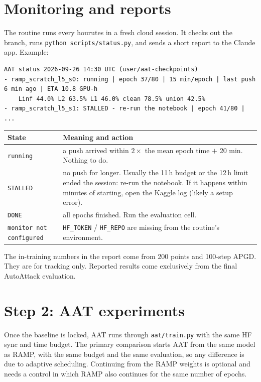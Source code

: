 \documentclass[11pt,a4paper]{article}
\newcommand{\code}[1]{\texttt{\small #1}}
\begin{document}
\section{Monitoring and reports}

The routine runs every hourutes in a fresh cloud session. It checks out the branch, runs
\code{python scripts/status.py}, and sends a short report to the Claude app. Example:
\begin{lstlisting}
AAT status 2026-09-26 14:30 UTC (user/aat-checkpoints)
- ramp_scratch_l5_s0: running | epoch 37/80 | 15 min/epoch | last push 6 min ago | ETA 10.8 GPU-h
    Linf 44.0% L2 63.5% L1 46.0% clean 78.5% union 42.5%
- ramp_scratch_l5_s1: STALLED - re-run the notebook | epoch 41/80 | ...
\end{lstlisting}

\begin{table}[h]
\centering\small
\begin{tabularx}{\linewidth}{@{}lX@{}}
\toprule
State & Meaning and action \\
\midrule
\code{running} & a push arrived within $2\times$ the mean epoch time $+$ 20 min. Nothing to do. \\
\code{STALLED} & no push for longer. Usually the 11\,h budget or the 12\,h limit ended the session: re-run the notebook. If it happens within minutes of starting, open the Kaggle log (likely a setup error). \\
\code{DONE} & all epochs finished. Run the evaluation cell. \\
\code{monitor not configured} & \code{HF\_TOKEN} / \code{HF\_REPO} are missing from the routine's environment. \\
\bottomrule
\end{tabularx}
\end{table}
The in-training numbers in the report come from 200 points and 100-step APGD. They are for tracking
only. Reported results come exclusively from the final AutoAttack evaluation.

\section{Step 2: AAT experiments}

Once the baseline is locked, AAT runs through \code{aat/train.py} with the same HF sync and time
budget. The primary comparison starts AAT from the same model as RAMP, with the same budget and the
same evaluation, so any difference is due to adaptive scheduling. Continuing from the RAMP weights is
optional and needs a control in which RAMP also continues for the same number of epochs.
\end{document}
